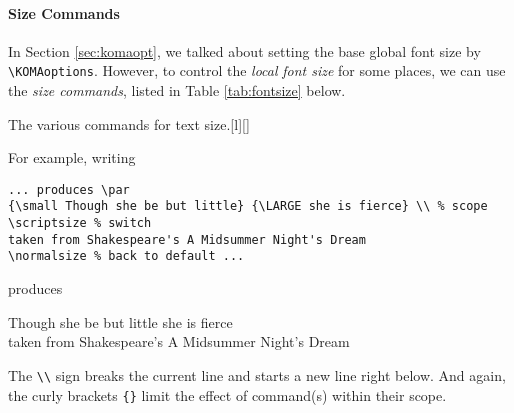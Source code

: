 \paragraph{Size Commands}
In Section \ref{sec:komaopt}, we talked about setting the base global font size by \texttt{\textbackslash KOMAoptions}. However, to control the \textit{local} \textit{font size} for some places, we can use the \textit{size commands}, listed in Table \ref{tab:fontsize} below.
\begin{table}[ht]
\begin{captionbeside}[test]{The various commands for text size.\footnotemark}[l][\textwidth]{
}
\end{captionbeside}
\label{tab:fontsize}
\end{table}
For example, writing
\begin{lstlisting}
... produces \par
{\small Though she be but little} {\LARGE she is fierce} \\ % scope
\scriptsize % switch
taken from Shakespeare's A Midsummer Night's Dream
\normalsize % back to default ...
\end{lstlisting}
produces \par
{\small Though she be but little} {\LARGE she is fierce} \\
\scriptsize
taken from Shakespeare's A Midsummer Night's Dream
\normalsize \par
The \texttt{\textbackslash \textbackslash} sign breaks the current line and starts a new line right below. And again, the curly brackets \verb|{}| limit the effect of command(s) within their scope.

